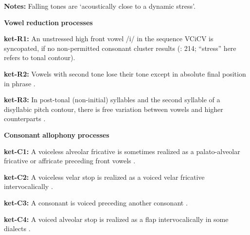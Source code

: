 \begin{styleBody}
\textbf{Notes:} Falling tones are ‘acoustically close to a dynamic stress’.
\end{styleBody}

\begin{styleBody}
\textbf{Vowel} \textbf{reduction} \textbf{processes}
\end{styleBody}

\begin{styleBody}
\textbf{ket-R1:} An unstressed high front vowel /i/ in the sequence VCiCV is syncopated, if no non-permitted consonant cluster results (\citealt{Georg2007}: 214; “stress” here refers to tonal contour).
\end{styleBody}

\begin{styleBody}
\textbf{ket-R2:} Vowels with second tone lose their tone except in absolute final position in phrase \citep[15-16]{Vajda2000}.
\end{styleBody}

\begin{styleBody}
\textbf{ket-R3:} In post-tonal (non-initial) syllables and the second syllable of a disyllabic pitch contour, there is free variation between vowels and higher counterparts \citep[11]{Vajda2000}.
\end{styleBody}

\begin{styleBody}
\textbf{Consonant} \textbf{allophony} \textbf{processes}
\end{styleBody}

\begin{styleBody}
\textbf{ket-C1:} A voiceless alveolar fricative is sometimes realized as a palato-alveolar fricative or affricate preceding front vowels \citep[78]{Georg2007}.
\end{styleBody}

\begin{styleBody}
\textbf{ket-C2:} A voiceless velar stop is realized as a voiced velar fricative intervocalically \citep[75]{Georg2007}.
\end{styleBody}

\begin{styleBody}
\textbf{ket-C3:} A consonant is voiced preceding another consonant \citep[75]{Georg2007}.
\end{styleBody}

\begin{styleBody}
\textbf{ket-C4:} A voiced alveolar stop is realized as a flap intervocalically in some dialects \citep[76]{Georg2007}.
\end{styleBody}


